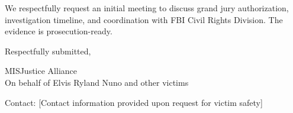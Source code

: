 \documentclass[12pt,oneside]{article}
\begin{document}
\begin{flushleft}
We respectfully request an initial meeting to discuss grand jury authorization, investigation timeline, and coordination with FBI Civil Rights Division. The evidence is prosecution-ready.

\vspace{0.3in}

\noindent
Respectfully submitted,

\vspace{0.3in}

\noindent
MISJustice Alliance \\
On behalf of Elvis Ryland Nuno and other victims

\vspace{0.2in}

\noindent
Contact: [Contact information provided upon request for victim safety]

\end{flushleft}
\end{document}
